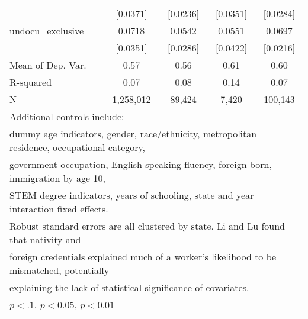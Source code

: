 \begin{table}[htbp]
\begin{tabular}{l*{4}{c}}
                    &    [0.0371]         &    [0.0236]         &    [0.0351]         &    [0.0284]         \\
\addlinespace
undocu\_exclusive    &      0.0718\sym{**} &      0.0542\sym{*}  &      0.0551         &      0.0697\sym{***}\\
                    &    [0.0351]         &    [0.0286]         &    [0.0422]         &    [0.0216]         \\
\midrule
Mean of Dep. Var.   &        0.57         &        0.56         &        0.61         &        0.60         \\
R-squared           &        0.07         &        0.08         &        0.14         &        0.07         \\
N                   &   1,258,012         &      89,424         &       7,420         &     100,143         \\
\bottomrule
\multicolumn{5}{l}{\footnotesize Additional controls include:}\\
\multicolumn{5}{l}{\footnotesize dummy age indicators, gender, race/ethnicity, metropolitan residence, occupational category,}\\
\multicolumn{5}{l}{\footnotesize government occupation, English-speaking fluency, foreign born, immigration by age 10,}\\
\multicolumn{5}{l}{\footnotesize STEM degree indicators, years of schooling, state and year interaction fixed effects.}\\
\multicolumn{5}{l}{\footnotesize Robust standard errors are all clustered by state. Li and Lu found that nativity and}\\
\multicolumn{5}{l}{\footnotesize foreign credentials explained much of a worker's likelihood to be mismatched, potentially}\\
\multicolumn{5}{l}{\footnotesize explaining the lack of statistical significance of covariates.}\\
\multicolumn{5}{l}{\footnotesize \sym{*} \(p<.1\), \sym{**} \(p<0.05\), \sym{***} \(p<0.01\)}\\
\end{tabular}
\end{table}
